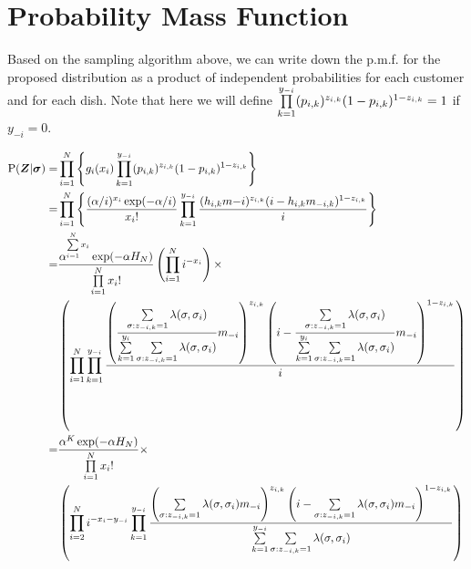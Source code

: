\section{Probability Mass Function}
Based on the sampling algorithm above, we can write down the p.m.f. for the
proposed distribution as a product of independent probabilities for 
each customer and for each dish. Note that here we will define 
$\prod\limits_{k=1}^{y_{-i}} (p_{i,k})^{z_{i,k}}(1-p_{i,k})^{1-z_{i,k}}=1$ if $y_{-i}=0$.

\begin{align*}
  \text{P}(\bm Z|\bm\sigma)
  =&\prod\limits_{i=1}^{N} \left\{g_i(x_i) \prod\limits_{k=1}^{y_{-i}} 
    (p_{i,k})^{z_{i,k}}(1-p_{i,k})^{1-z_{i,k}}\right\}\\
  =&\prod\limits_{i=1}^{N} \left\{ \displaystyle\frac{(\alpha/i)^{x_i}\exp(-\alpha/i)}{x_i!} 
    \prod\limits_{k=1}^{y_{-i}} 
    \displaystyle\frac{(h_{i,k}m{-i})^{z_{i,k}}(i-h_{i,k}m_{-i,k})^{1-z_{i,k}}}{i} 
    \right\} \\
  =&\displaystyle\frac{\alpha^{\sum\limits_{i=1}^{N}x_i} \exp(-\alpha H_N)} {\prod\limits_{i=1}^{N}x_i!} 
    \left( \prod\limits_{i=1}^{N}i^{-x_i} \right) \times
    \\
    &\left( \prod\limits_{i=1}^{N}\prod\limits_{k=1}^{y_{-i}} 
    \displaystyle\frac{\left(\displaystyle\frac{\sum\limits_{\sigma:z_{-i,k}=1}^{}\lambda(\sigma,\sigma_i)} {\sum\limits_{k=1}^{y_i}\sum\limits_{\sigma:z_{-i,k}=1}^{}\lambda(\sigma,\sigma_i)} m_{-i}\right)^{z_{i,k}}
             \left(i-\displaystyle\frac{\sum\limits_{\sigma:z_{-i,k}=1}^{}\lambda(\sigma,\sigma_i)} {\sum\limits_{k=1}^{y_i}\sum\limits_{\sigma:z_{-i,k}=1}^{}\lambda(\sigma,\sigma_i)} m_{-i}\right)^{1-z_{i,k}}}{i} \right)\\
  =&\displaystyle\frac{\alpha^K \exp(-\alpha H_N)} {\prod\limits_{i=1}^{N}x_i!} \times
    \\
    &\left( \prod\limits_{i=2}^{N} i^{-x_i-y_{-i}}\prod\limits_{k=1}^{y_{-i}} 
    \displaystyle\frac{
    \left(\sum\limits_{\sigma:z_{-i,k}=1}^{}\lambda(\sigma,\sigma_i)m_{-i}\right)^{z_{i,k}}
    \left(i-\sum\limits_{\sigma:z_{-i,k}=1}^{}
    \lambda(\sigma,\sigma_i)m_{-i}\right)^{1-z_{i,k}}
    }
    {\sum\limits_{k=1}^{y_{-i}}\sum\limits_{\sigma:z_{-i,k}=1}^{}\lambda(\sigma,\sigma_i)}\right)
\end{align*}


